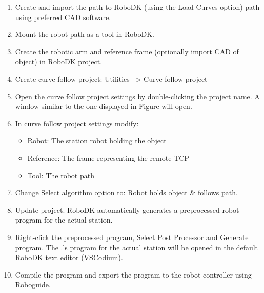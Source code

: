 \begin{enumerate}

\item Create and import the path to RoboDK  (using the Load Curves option) path using preferred CAD software. 

\item Mount the robot path as a tool in RoboDK.

\item Create the robotic arm and reference frame (optionally import CAD of object) in RoboDK project. 

\item Create curve follow project: Utilities --> Curve follow project

\item Open the curve follow project settings by double-clicking the project name. A window similar to the one displayed in Figure will open. 

\item In curve follow project settings modify:

    \begin{itemize}

        \item Robot: The station robot holding the object
        \item Reference: The frame representing the remote TCP
        \item Tool: The robot path
        
    \end{itemize}
    
\item Change Select algorithm option to: Robot holds object & follows path.

\item Update project. RoboDK automatically generates a preprocessed robot program for the actual station.

\item Right-click the preprocessed program, Select Post Processor and Generate program. The .ls program for the actual station will be opened in the default RoboDK text editor (VSCodium).

\item Compile the program and export the program to the robot controller using Roboguide. 
    
\end{enumerate}

